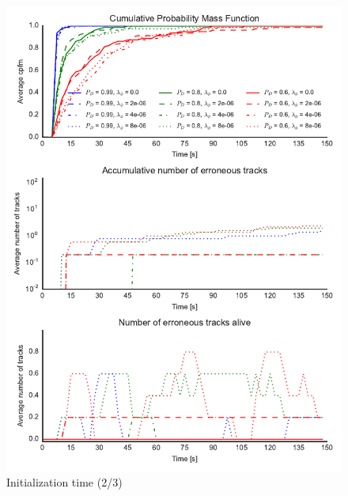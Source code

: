 \begin{figure}
\centering
\includegraphics{Figures/plots/Scenario0_Init-Time(2-3).pdf}
\caption{Initialization time (2/3)}\label{fig:init_time_2-3}
\end{figure}

